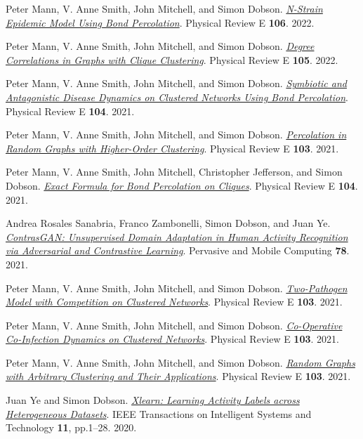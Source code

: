 \documentclass[11pt]{article}
\begin{document}
\label{org0cfde9d}Peter Mann, V. Anne Smith, John Mitchell, and Simon Dobson.  \emph{\href{https://doi.org/10.1103/PhysRevE.106.014304}{N-Strain Epidemic Model Using Bond Percolation}}. Physical Review E \textbf{106}. 2022.

\label{orgfad3d82}Peter Mann, V. Anne Smith, John Mitchell, and Simon Dobson.  \emph{\href{https://doi.org/10.1103/PhysRevE.105.044314}{Degree Correlations in Graphs with Clique Clustering}}. Physical Review E \textbf{105}. 2022.

\label{orge47ea72}Peter Mann, V. Anne Smith, John Mitchell, and Simon Dobson.  \emph{\href{https://doi.org/10.1103/PhysRevE.104.024303}{Symbiotic and Antagonistic Disease Dynamics on Clustered Networks Using Bond Percolation}}. Physical Review E \textbf{104}. 2021.

\label{orgd441ae0}Peter Mann, V. Anne Smith, John Mitchell, and Simon Dobson.  \emph{\href{https://doi.org/10.1103/PhysRevE.103.012313}{Percolation in Random Graphs with Higher-Order Clustering}}. Physical Review E \textbf{103}. 2021.

\label{org3e619b6}Peter Mann, V. Anne Smith, John Mitchell, Christopher Jefferson, and Simon Dobson.  \emph{\href{https:/doi.org/10.1103/PhysRevE.104.024304}{Exact Formula for Bond Percolation on Cliques}}. Physical Review E \textbf{104}. 2021.

\label{org1d29cea}Andrea Rosales Sanabria, Franco Zambonelli, Simon Dobson, and Juan Ye.  \emph{\href{https://doi.org/10.1016/j.pmcj.2021.101477}{ContrasGAN: Unsupervised Domain Adaptation in Human Activity Recognition via Adversarial and Contrastive Learning}}. Pervasive and Mobile Computing \textbf{78}. 2021.

\label{orgbd4e008}Peter Mann, V. Anne Smith, John Mitchell, and Simon Dobson.  \emph{\href{https://doi.org/10.1103/PhysRevE.103.062308}{Two-Pathogen Model with Competition on Clustered Networks}}. Physical Review E \textbf{103}. 2021.

\label{orgb9a4e28}Peter Mann, V. Anne Smith, John Mitchell, and Simon Dobson.  \emph{\href{https://doi.org/10.1103/PhysRevE.103.042307}{Co-Operative Co-Infection Dynamics on Clustered Networks}}. Physical Review E \textbf{103}. 2021.

\label{orgc4dee49}Peter Mann, V. Anne Smith, John Mitchell, and Simon Dobson.  \emph{\href{https://doi.org/10.1103/PhysRevE.103.012309}{Random Graphs with Arbitrary Clustering and Their Applications}}. Physical Review E \textbf{103}. 2021.

\label{orgdeff7bf}Juan Ye and Simon Dobson.  \emph{\href{https://dx.doi.org//10.1145/3368272}{Xlearn: Learning Activity Labels across Heterogeneous Datasets}}. IEEE Transactions on Intelligent Systems and Technology \textbf{11}, pp.1–28. 2020.
\end{document}
